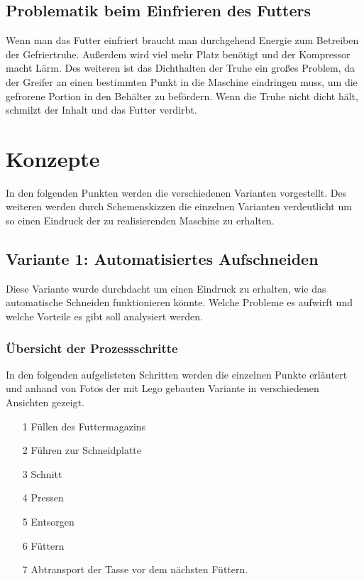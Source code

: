 \subsection{Problematik beim Einfrieren des Futters}

Wenn man das Futter einfriert braucht man durchgehend Energie zum Betreiben der Gefriertruhe. Außerdem wird viel mehr Platz benötigt und der Kompressor macht Lärm. Des weiteren ist das Dichthalten der Truhe ein großes Problem, da der Greifer an einen bestimmten Punkt in die Maschine eindringen muss, um die gefrorene Portion in den Behälter zu befördern. Wenn die Truhe nicht dicht hält, schmilzt der Inhalt und das Futter verdirbt.

\section{Konzepte} 

In den folgenden Punkten werden die verschiedenen Varianten vorgestellt. Des weiteren werden durch Schemenskizzen die einzelnen Varianten verdeutlicht um so einen Eindruck der zu realisierenden Maschine zu erhalten.

\subsection{Variante 1: Automatisiertes Aufschneiden} 

Diese Variante wurde durchdacht um einen Eindruck zu erhalten, wie das automatische Schneiden funktionieren könnte. Welche Probleme es aufwirft und welche Vorteile es gibt soll analysiert werden.

\subsubsection{Übersicht der Prozessschritte}

In den folgenden aufgelisteten Schritten werden die einzelnen Punkte erläutert und anhand von Fotos der mit Lego gebauten Variante in verschiedenen Ansichten gezeigt.

\begin{itemize}
\item[1] Füllen des Futtermagazins
\item[2] Führen zur Schneidplatte
\item[3] Schnitt
\item[4] Pressen
\item[5] Entsorgen
\item[6] Füttern
\item[7] Abtransport der Tasse vor dem nächsten Füttern.
\end{itemize}



